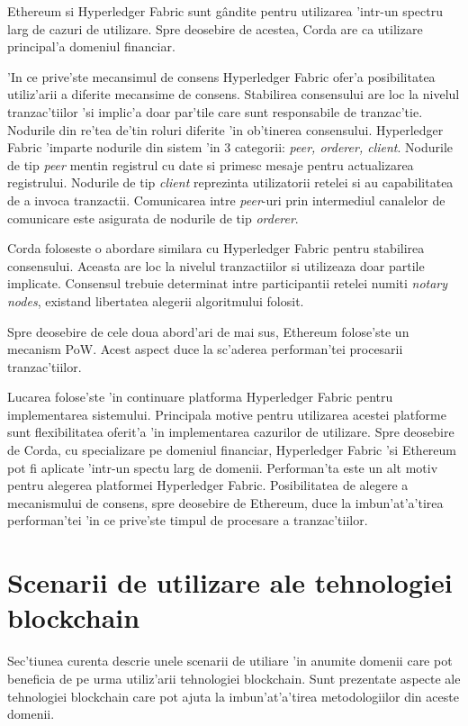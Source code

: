 \documentclass[12pt,a4paper,twoside]{report}
\begin{document}
Ethereum si Hyperledger Fabric sunt g\^andite pentru utilizarea 'intr-un spectru larg de cazuri de utilizare. Spre deosebire de acestea, Corda are ca utilizare principal'a domeniul financiar\cite{cordadoc}.

'In ce prive'ste mecansimul de consens Hyperledger Fabric ofer'a posibilitatea utiliz'arii a diferite mecansime de consens. Stabilirea consensului are loc la  nivelul tranzac'tiilor 'si implic'a doar par'tile care sunt responsabile de  tranzac'tie. Nodurile din re'tea de'tin roluri diferite 'in ob'tinerea consensului. Hyperledger Fabric 'imparte nodurile din sistem 'in 3 categorii: \emph{peer, orderer, client}\cite{fabricdoc}\cite{hlfv}. Nodurile de tip \emph{peer} mentin registrul cu date si primesc mesaje pentru actualizarea registrului. Nodurile de tip \emph{client} reprezinta utilizatorii retelei si au capabilitatea de a invoca tranzactii. Comunicarea intre \emph{peer}-uri prin intermediul canalelor de comunicare este asigurata de nodurile de tip \emph{orderer}.

Corda foloseste o abordare similara cu Hyperledger Fabric pentru stabilirea consensului. Aceasta are loc la nivelul tranzactiilor si utilizeaza doar partile implicate. Consensul trebuie determinat intre participantii retelei numiti \emph{notary nodes}\cite{cordadoc}, existand libertatea alegerii algoritmului folosit.

Spre deosebire de cele doua abord'ari de mai sus, Ethereum folose'ste un mecanism PoW. Acest aspect duce la sc'aderea performan'tei procesarii tranzac'tiilor. 

Lucarea folose'ste 'in continuare platforma Hyperledger Fabric pentru implementarea sistemului. Principala motive pentru utilizarea acestei platforme sunt flexibilitatea oferit'a 'in implementarea cazurilor de utilizare. Spre deosebire de Corda, cu specializare pe domeniul financiar, Hyperledger Fabric 'si Ethereum pot fi aplicate 'intr-un spectu larg de domenii. Performan'ta este un alt motiv pentru alegerea platformei Hyperledger Fabric. Posibilitatea de alegere a mecanismului de consens, spre deosebire de Ethereum, duce la imbun'at'a'tirea performan'tei 'in ce prive'ste timpul de procesare a tranzac'tiilor. 

\section{Scenarii de utilizare ale tehnologiei blockchain}
Sec'tiunea curenta descrie unele scenarii de utiliare 'in anumite domenii care pot beneficia de pe urma utiliz'arii tehnologiei blockchain. Sunt prezentate aspecte ale tehnologiei blockchain care pot ajuta la imbun'at'a'tirea metodologiilor din aceste domenii.
\end{document}
